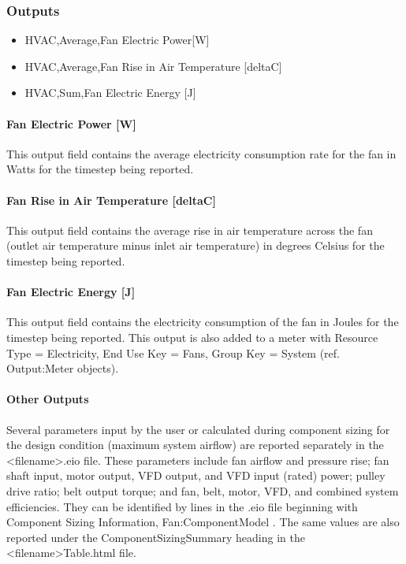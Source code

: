 \subsubsection{Outputs}\label{outputs-4-005}

\begin{itemize}
\item
  HVAC,Average,Fan Electric Power{[}W{]}
\item
  HVAC,Average,Fan Rise in Air Temperature {[}deltaC{]}
\item
  HVAC,Sum,Fan Electric Energy {[}J{]}
\end{itemize}

\paragraph{Fan Electric Power {[}W{]}}\label{fan-electric-power-w-4}

This output field contains the average electricity consumption rate for the fan in Watts for the timestep being reported.

\paragraph{Fan Rise in Air Temperature {[}deltaC{]}}\label{fan-rise-in-air-temperature-deltac-4}

This output field contains the average rise in air temperature across the fan (outlet air temperature minus inlet air temperature) in degrees Celsius for the timestep being reported.

\paragraph{Fan Electric Energy {[}J{]}}\label{fan-electric-energy-j-4}

This output field contains the electricity consumption of the fan in Joules for the timestep being reported. This output is also added to a meter with Resource Type = Electricity, End Use Key = Fans, Group Key = System (ref. Output:Meter objects).

\paragraph{Other Outputs}\label{other-outputs}

Several parameters input by the user or calculated during component sizing for the design condition (maximum system airflow) are reported separately in the \textless{}filename\textgreater{}.eio file. These parameters include fan airflow and pressure rise; fan shaft input, motor output, VFD output, and VFD input (rated) power; pulley drive ratio; belt output torque; and fan, belt, motor, VFD, and combined system efficiencies. They can be identified by lines in the .eio file beginning with Component Sizing Information, Fan:ComponentModel . The same values are also reported under the ComponentSizingSummary heading in the \textless{}filename\textgreater{}Table.html file.